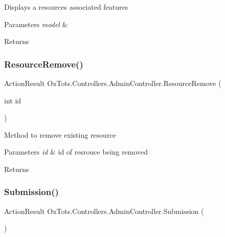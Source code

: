 Displays a resource\textquotesingle{}s associated features 


\begin{DoxyParams}{Parameters}
{\em model} & \\
\hline
\end{DoxyParams}
\begin{DoxyReturn}{Returns}

\end{DoxyReturn}
\mbox{\label{class_ox_tots_1_1_controllers_1_1_admin_controller_a4af2a0f2d61212e1170629cff6b6600c}} 
\subsubsection{\texorpdfstring{ResourceRemove()}{ResourceRemove()}}
{\footnotesize\ttfamily Action\+Result Ox\+Tots.\+Controllers.\+Admin\+Controller.\+Resource\+Remove (\begin{DoxyParamCaption}\item[{int}]{id }\end{DoxyParamCaption})\hspace{0.3cm}{\ttfamily [inline]}}



Method to remove existing resource 


\begin{DoxyParams}{Parameters}
{\em id} & id of resrouce being removed\\
\hline
\end{DoxyParams}
\begin{DoxyReturn}{Returns}

\end{DoxyReturn}
\mbox{\label{class_ox_tots_1_1_controllers_1_1_admin_controller_ab325e78a1c8c85393b5e4fd81d33307d}} 
\subsubsection{\texorpdfstring{Submission()}{Submission()}}
{\footnotesize\ttfamily Action\+Result Ox\+Tots.\+Controllers.\+Admin\+Controller.\+Submission (\begin{DoxyParamCaption}{ }\end{DoxyParamCaption})\hspace{0.3cm}{\ttfamily [inline]}}



